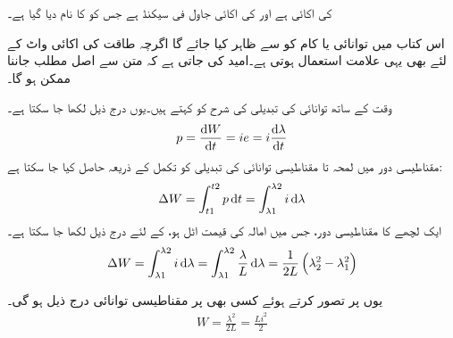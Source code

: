   کی اکائی   ہے اور   کی اکائی جاول فی سیکنڈ ہے جس کو   کا نام دیا گیا  ہے۔

اس کتاب میں توانائی یا کام کو  سے ظاہر کیا جائے گا اگرچہ طاقت کی اکائی واٹ  کے لئے بھی یہی علامت استعمال ہوتی ہے۔امید کی جاتی ہے کہ متن سے  اصل مطلب جاننا ممکن ہو گا۔

وقت  کے ساتھ توانائی  کی تبدیلی کی شرح کو   کہتے ہیں۔یوں درج ذیل لکھا جا سکتا ہے۔
\begin{align}
p=\frac{\dif W}{\dif t} = ie = i \frac{\dif \lambda}{\dif t}
\end{align} 
مقناطیسی دور میں  لمحہ  تا   مقناطیسی توانائی کی تبدیلی کو تکمل کے ذریعہ حاصل کیا جا سکتا ہے:
\begin{align}
\Delta W = \int_{t1}^{t2} p \dif t =\int_{\lambda1}^{\lambda2} i \dif \lambda
\end{align}
ایک لچھے کا مقناطیسی دور، جس میں  امالہ کی قیمت اٹل ہو، کے لئے درج ذیل لکھا جا سکتا ہے۔
\begin{align}
\Delta W = \int_{\lambda1}^{\lambda2} i \dif \lambda=\int_{\lambda1}^{\lambda2} \frac{\lambda}{L} \dif \lambda=\frac{1}{2 L} \left(\lambda_2^2-\lambda_1^2 \right)
\end{align}

یوں  پر  تصور کرتے ہوئے  کسی بھی  پر مقناطیسی توانائی درج ذیل ہو گی۔
\begin{align}
 W=\frac{\lambda^2}{2L}=\frac{L i^2}{2}
\end{align}

